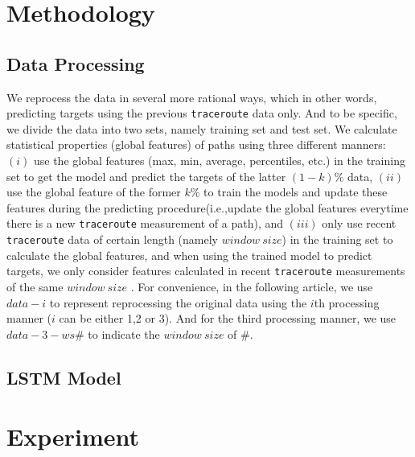 \documentclass[sigconf]{acmart}
\begin{document}
	\section{Methodology}
	\subsection{Data Processing}
	We reprocess the data in several more rational ways, which in other words, predicting targets using the previous \texttt{traceroute} data only. And to be specific, we divide the data into two sets, namely training set and test set. We calculate statistical properties (global features) of paths using three different manners: $(i)$ use the global features (max, min, average, percentiles, etc.) in the training set to get the model and predict the targets of the latter $(1-k)\%$ data, $(ii)$ use the global feature of the former $k\%$ to train the models and update these features during the predicting procedure(i.e.,update the global features everytime there is a new \texttt{traceroute} measurement of a path), and $(iii)$ only use recent \texttt{traceroute} data of certain length (namely $window\ size$) in the training set to calculate the global features, and when using the trained model to predict targets, we only consider features calculated in  recent \texttt{traceroute} measurements of the same $window\ size$ . For convenience, in the following article, we use $data-i$ to represent reprocessing the original data using the $i$th processing manner ($i$ can be either 1,2 or 3). And for the third processing manner, we use $data-3-ws\#$ to indicate the $window\ size$ of $\#$.
	
	\subsection{LSTM Model}
	
	\section{Experiment}
\end{document}
